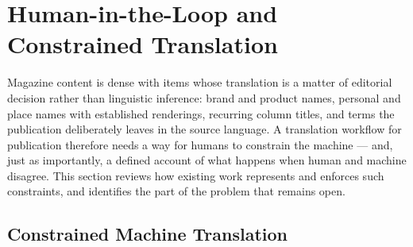 \section{Human-in-the-Loop and Constrained Translation}
\label{sec:background-hitl}

Magazine content is dense with items whose translation is a matter of
editorial decision rather than linguistic inference: brand and product
names, personal and place names with established renderings, recurring
column titles, and terms the publication deliberately leaves in the
source language. A translation workflow for publication therefore
needs a way for humans to constrain the machine --- and, just as
importantly, a defined account of what happens when human and machine
disagree. This section reviews how existing work represents and
enforces such constraints, and identifies the part of the problem that
remains open.

\subsection{Constrained Machine Translation}

